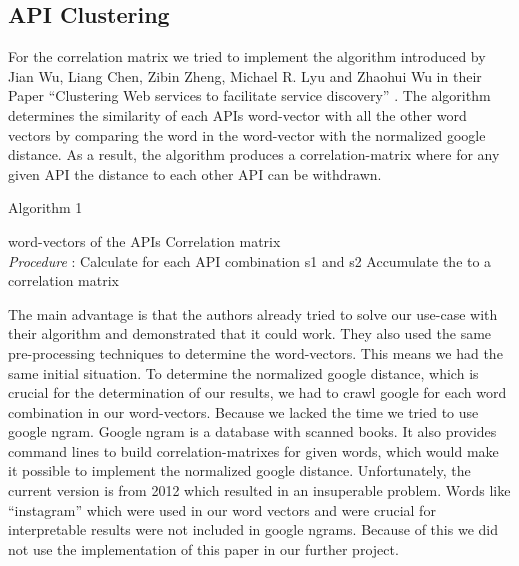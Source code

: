 \documentclass[a4paper]{IEEEtran}
\begin{document}
\subsection{API Clustering}
For the correlation matrix we tried to implement the algorithm introduced by Jian Wu, Liang Chen, Zibin Zheng, Michael R. Lyu and Zhaohui Wu in their Paper “Clustering Web services to facilitate service discovery” \cite{kanungo2002efficient}. The algorithm determines the similarity of each APIs word-vector with all the other word vectors by comparing the word in the word-vector with the normalized google distance. As a result, the algorithm produces a correlation-matrix where for any given API the distance to each other API can be withdrawn.

\begin{algorithm}[H]
 \caption{Algorithm 1}
 \begin{algorithmic}[1]
\renewcommand{\algorithmicrequire}{\textbf{Input:}}
 \renewcommand{\algorithmicensure}{\textbf{Output:}}
 \REQUIRE word-vectors of the APIs
 \ENSURE  Correlation matrix
 \\ \textit{Procedure} :
  \STATE Calculate for each API combination s1 and s2
 \STATE Accumulate the to a correlation matrix
 \end{algorithmic}
 \end{algorithm}

The main advantage is that the authors already tried to solve our use-case with their algorithm and demonstrated that it could work. They also used the same pre-processing techniques to determine the word-vectors. This means we had the same initial situation.
To determine the normalized google distance, which is crucial for the determination of our results, we had to crawl google for each word combination in our word-vectors. Because we lacked the time we tried to use google ngram. Google ngram is a database with scanned books. It also provides command lines to build correlation-matrixes for given words, which would make it possible to implement the normalized google distance. Unfortunately, the current version is from 2012 which resulted in an insuperable problem. Words like “instagram” which were used in our word vectors and were crucial for interpretable results were not included in google ngrams. Because of this we did not use the implementation of this paper in our further project.
\end{document}
